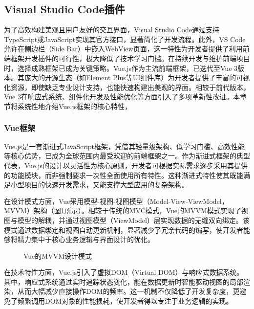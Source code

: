 \documentclass[UTF8,a4paper,12pt]{ctexart}
\numberwithin{equation}{section}
\begin{document}
\subsection{Visual Studio Code插件}
为了高效构建美观且用户友好的交互界面，Visual Studio Code通过支持TypeScript或JavaScript实现其官方接口，显著简化了开发流程。此外，VS Code允许在侧边栏（Side Bar）中嵌入WebView页面，这一特性为开发者提供了利用前端框架开发插件的可行性，极大降低了技术学习门槛。在持续开发与维护前端项目时，选择成熟框架已成为关键策略。Vue.js作为主流前端框架，已迭代至Vue 3版本。其庞大的开源生态（如Element Plus等UI组件库）为开发者提供了丰富的可视化资源，即使缺乏专业设计支持，也能快速构建出美观的界面。相较于前代版本，Vue 3在响应式系统、组件化开发及性能优化等方面引入了多项革新性改进。本章节将系统性地介绍Vue.js框架的核心特性，\par
\subsubsection{Vue框架}
Vue.js是一套渐进式JavaScript框架，凭借其轻量级架构、低学习门槛、高效性能等核心优势，已成为全球范围内最受欢迎的前端框架之一。作为渐进式框架的典型代表，Vue.js的设计以灵活性为核心原则，开发者可根据实际需求逐步采用其提供的功能模块，而非强制要求一次性全面使用所有特性。这种渐进式特性使其既能满足小型项目的快速开发需求，又能支撑大型应用的复杂架构。\par
在设计模式方面，Vue采用模型-视图-视图模型（Model-View-ViewModel，MVVM）架构（图\ref{MVVM}所示）。相较于传统的MVC模式，Vue的MVVM模式实现了视图与模型的解耦，并通过视图模型（ViewModel）层实现数据的无缝双向绑定。该模式通过数据绑定和视图自动更新机制，显著减少了冗余代码的编写，使开发者能够将精力集中于核心业务逻辑与界面设计的优化。\par
\begin{figure}[H]
	\caption{Vue的MVVM设计模式}
	\label{MVVM}
\end{figure}
在技术特性方面，Vue.js引入了虚拟DOM（Virtual DOM）与响应式数据系统。其中，响应式系统通过实时追踪状态变化，能在数据更新时智能驱动视图的局部渲染，从而大幅减少直接操作DOM的频率。这一机制不仅降低了开发复杂度，更避免了频繁调用DOM对象的性能损耗，使开发者得以专注于业务逻辑的实现。\par
\end{document}
